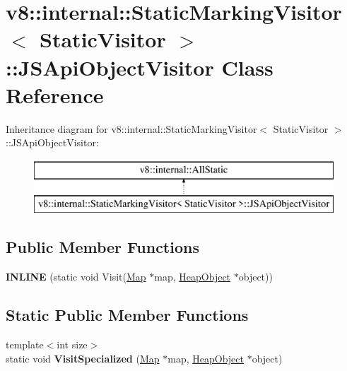 \hypertarget{classv8_1_1internal_1_1_static_marking_visitor_1_1_j_s_api_object_visitor}{}\section{v8\+:\+:internal\+:\+:Static\+Marking\+Visitor$<$ Static\+Visitor $>$\+:\+:J\+S\+Api\+Object\+Visitor Class Reference}
\label{classv8_1_1internal_1_1_static_marking_visitor_1_1_j_s_api_object_visitor}
Inheritance diagram for v8\+:\+:internal\+:\+:Static\+Marking\+Visitor$<$ Static\+Visitor $>$\+:\+:J\+S\+Api\+Object\+Visitor\+:\begin{figure}[H]
\begin{center}
\leavevmode
\includegraphics[height=2.000000cm]{classv8_1_1internal_1_1_static_marking_visitor_1_1_j_s_api_object_visitor}
\end{center}
\end{figure}
\subsection*{Public Member Functions}
\begin{DoxyCompactItemize}
\item 
{\bfseries I\+N\+L\+I\+NE} (static void Visit(\hyperlink{classv8_1_1internal_1_1_map}{Map} $\ast$map, \hyperlink{classv8_1_1internal_1_1_heap_object}{Heap\+Object} $\ast$object))\hypertarget{classv8_1_1internal_1_1_static_marking_visitor_1_1_j_s_api_object_visitor_a6abf453945f61577a551d3c6af950ff9}{}\label{classv8_1_1internal_1_1_static_marking_visitor_1_1_j_s_api_object_visitor_a6abf453945f61577a551d3c6af950ff9}

\end{DoxyCompactItemize}
\subsection*{Static Public Member Functions}
\begin{DoxyCompactItemize}
\item 
{\footnotesize template$<$int size$>$ }\\static void {\bfseries Visit\+Specialized} (\hyperlink{classv8_1_1internal_1_1_map}{Map} $\ast$map, \hyperlink{classv8_1_1internal_1_1_heap_object}{Heap\+Object} $\ast$object)\hypertarget{classv8_1_1internal_1_1_static_marking_visitor_1_1_j_s_api_object_visitor_a76c662652caf79c42264531c477c07d0}{}\label{classv8_1_1internal_1_1_static_marking_visitor_1_1_j_s_api_object_visitor_a76c662652caf79c42264531c477c07d0}

\end{DoxyCompactItemize}
